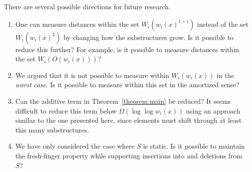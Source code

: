 \documentclass{llncs}
\newcommand{\BigOh}[1]{O\!\left(#1\right)}
\newcommand{\BigOmega}[1]{\Omega\!\left(#1\right)}
\begin{document}
There are several possible directions for future research.

\begin{enumerate}
\item One can measure distances within the set $W_i(w_i(x)^{1+\epsilon})$ instead of the set $W_i(w_i(x)^2)$ by changing how the substructures grow. Is it possible to reduce this further? For example, is it possible to measure distances within the set $W_i(\BigOh{w_i(x)})$?

\item We argued that it is not possible to measure within $W_i(w_i(x))$ in the \emph{worst case}. Is it possible to measure within this set in the amortized sense?

\item Can the additive term in Theorem~\ref{theorem:main} be reduced? It seems difficult to reduce this term below $\BigOmega{\log \log w_i(x)}$ using an approach similar to the one presented here, since elements must shift through at least this many substructures.

\item We have only considered the case where $S$ is static. Is it possible to maintain the fresh-finger property while supporting insertions into and deletions from $S$?
\end{enumerate}



\end{document}
